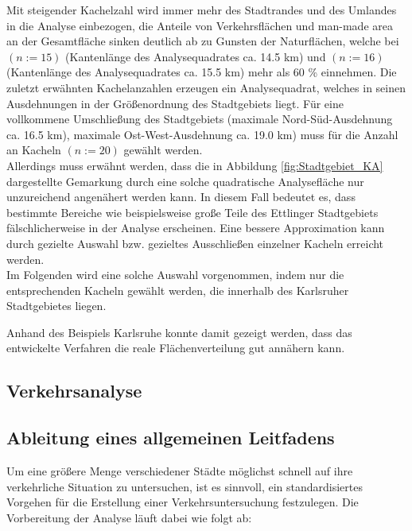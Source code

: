 \documentclass[12pt,a4paper]{scrartcl}
\begin{document}
Mit steigender Kachelzahl wird immer mehr des Stadtrandes und des Umlandes in die Analyse einbezogen, die Anteile von Verkehrsflächen und man-made area an der Gesamtfläche sinken deutlich ab zu Gunsten der Naturflächen, welche bei  \((n:=15)\) (Kantenlänge des Analysequadrates ca. \num{14.5} \si{\kilo\metre}) und  \((n:=16)\) (Kantenlänge des Analysequadrates ca. \num{15.5} \si{\kilo\metre}) mehr als \num{60} \% einnehmen. Die zuletzt erwähnten Kachelanzahlen erzeugen ein Analysequadrat, welches in seinen Ausdehnungen in der Größenordnung des Stadtgebiets liegt. Für eine vollkommene Umschließung des Stadtgebiets (maximale Nord-Süd-Ausdehnung ca. \num{16.5} \si{\kilo\metre}), maximale Ost-West-Ausdehnung ca. \num{19.0} \si{\kilo\metre}) muss für die Anzahl an Kacheln \((n:=20)\) gewählt werden.\\
Allerdings muss erwähnt werden, dass die in Abbildung \ref{fig:Stadtgebiet_KA} dargestellte Gemarkung durch eine solche quadratische Analysefläche nur unzureichend angenähert werden kann. In diesem Fall bedeutet es, dass bestimmte Bereiche wie beispielsweise große Teile des Ettlinger Stadtgebiets fälschlicherweise in der Analyse erscheinen. Eine bessere Approximation kann durch gezielte Auswahl bzw. gezieltes Ausschließen einzelner Kacheln erreicht werden.\\
Im Folgenden wird eine solche Auswahl vorgenommen, indem nur die entsprechenden Kacheln gewählt werden, die innerhalb des Karlsruher Stadtgebietes liegen.

Anhand des Beispiels Karlsruhe konnte damit gezeigt werden, dass das entwickelte Verfahren die reale Flächenverteilung gut annähern kann. 

\newpage
\subsection{Verkehrsanalyse}

\newpage
\subsection{Ableitung eines allgemeinen Leitfadens}

Um eine größere Menge verschiedener Städte möglichst schnell auf ihre verkehrliche Situation zu untersuchen, ist es sinnvoll, ein standardisiertes Vorgehen für die Erstellung einer Verkehrsuntersuchung festzulegen. Die Vorbereitung der Analyse läuft dabei wie folgt ab:
\end{document}
